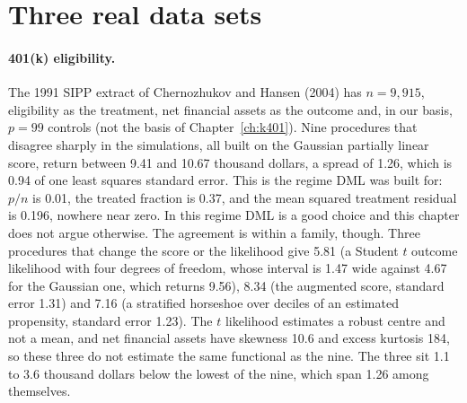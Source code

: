 \section{Three real data sets}\label{sec:crit:real}



\paragraph{401(k) eligibility.} The 1991 SIPP extract of Chernozhukov and Hansen (2004) has $n = 9{,}915$, eligibility as the treatment, net financial assets as the outcome and, in our basis, $p = 99$ controls (not the basis of Chapter~\ref{ch:k401}). Nine procedures that disagree sharply in the simulations, all built on the Gaussian partially linear score, return between 9.41 and 10.67 thousand dollars, a spread of 1.26, which is 0.94 of one least squares standard error. This is the regime DML was built for: $p/n$ is 0.01, the treated fraction is 0.37, and the mean squared treatment residual is 0.196, nowhere near zero. In this regime DML is a good choice and this chapter does not argue otherwise. The agreement is within a family, though. Three procedures that change the score or the likelihood give 5.81 (a Student $t$ outcome likelihood with four degrees of freedom, whose interval is 1.47 wide against 4.67 for the Gaussian one, which returns 9.56), 8.34 (the augmented score, standard error 1.31) and 7.16 (a stratified horseshoe over deciles of an estimated propensity, standard error 1.23). The $t$ likelihood estimates a robust centre and not a mean, and net financial assets have skewness 10.6 and excess kurtosis 184, so these three do not estimate the same functional as the nine. The three sit 1.1 to 3.6 thousand dollars below the lowest of the nine, which span 1.26 among themselves.

